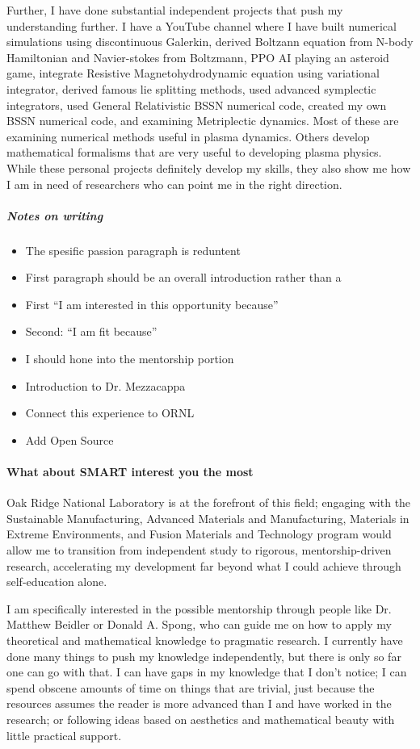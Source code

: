 Further, I have done substantial independent projects that push my understanding further. I have a YouTube channel where I have built numerical simulations using discontinuous Galerkin, derived Boltzann equation from N-body Hamiltonian and Navier-stokes from Boltzmann, PPO AI playing an asteroid game, integrate Resistive Magnetohydrodynamic equation using variational integrator, derived famous lie splitting methods, used advanced symplectic integrators, used General Relativistic BSSN numerical code, created my own BSSN numerical code, and examining Metriplectic dynamics. Most of these are examining numerical methods useful in plasma dynamics. Others develop mathematical formalisms that are very useful to developing plasma physics. While these personal projects definitely develop my skills, they also show me how I am in need of researchers who can point me in the right direction.
\subparagraph{Notes on writing}

\begin{itemize}
  \item The spesific passion paragraph is reduntent
  \item First paragraph should be an overall introduction rather than a
  \item First ``I am interested in this opportunity because''
  \item Second: ``I am fit because''
  \item I should hone into the mentorship portion
  \item Introduction to Dr. Mezzacappa
  \item Connect this experience to ORNL
  \item Add Open Source
\end{itemize}
\paragraph{What about SMART interest you the most}
Oak Ridge National Laboratory is at the forefront of this field; engaging with the Sustainable Manufacturing, Advanced Materials and Manufacturing, Materials in Extreme Environments, and Fusion Materials and Technology program would allow me to transition from independent study to rigorous, mentorship-driven research, accelerating my development far beyond what I could achieve through self-education alone.

I am specifically interested in the possible mentorship through people like Dr. Matthew Beidler or Donald A. Spong, who can guide me on how to apply my theoretical and mathematical knowledge to pragmatic research. I currently have done many things to push my knowledge independently, but there is only so far one can go with that. I can have gaps in my knowledge that I don’t notice; I can spend obscene amounts of time on things that are trivial, just because the resources assumes the reader is more advanced than I and have worked in the research; or following ideas based on aesthetics and mathematical beauty with little practical support.

